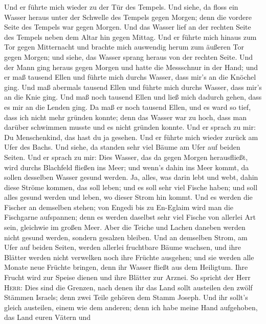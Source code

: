  Und er führte mich wieder zu der Tür des Tempels. Und
siehe, da floss ein Wasser heraus unter der Schwelle des Tempels gegen
Morgen; denn die vordere Seite des Tempels war gegen Morgen. Und das
Wasser lief an der rechten Seite des Tempels neben dem Altar hin gegen
Mittag.  Und er führte mich hinaus zum Tor gegen
Mitternacht und brachte mich auswendig herum zum äußeren Tor gegen
Morgen; und siehe, das Wasser sprang heraus von der rechten Seite.
 Und der Mann ging heraus gegen Morgen und hatte die
Messschnur in der Hand; und er maß tausend Ellen und führte mich durchs
Wasser, dass mir's an die Knöchel ging.  Und maß abermals
tausend Ellen und führte mich durchs Wasser, dass mir's an die Knie
ging. Und maß noch tausend Ellen und ließ mich dadurch gehen, dass es
mir an die Lenden ging.  Da maß er noch tausend Ellen, und
es ward so tief, dass ich nicht mehr gründen konnte; denn das Wasser war
zu hoch, dass man darüber schwimmen musste und es nicht gründen konnte.
 Und er sprach zu mir: Du Menschenkind, das hast du ja
gesehen. Und er führte mich wieder zurück am Ufer des Bachs.
 Und siehe, da standen sehr viel Bäume am Ufer auf beiden
Seiten.  Und er sprach zu mir: Dies Wasser, das da gegen
Morgen herausfließt, wird durchs Blachfeld fließen ins Meer; und wenn's
dahin ins Meer kommt, da sollen desselben Wasser gesund werden.
 Ja, alles, was darin lebt und webt, dahin diese Ströme
kommen, das soll leben; und es soll sehr viel Fische haben; und soll
alles gesund werden und leben, wo dieser Strom hin kommt.
 Und es werden die Fischer an demselben stehen; von
Engedi bis zu En-Eglaim wird man die Fischgarne aufspannen; denn es
werden daselbst sehr viel Fische von allerlei Art sein, gleichwie im
großen Meer.  Aber die Teiche und Lachen daneben werden
nicht gesund werden, sondern gesalzen bleiben.  Und an
demselben Strom, am Ufer auf beiden Seiten, werden allerlei fruchtbare
Bäume wachsen, und ihre Blätter werden nicht verwelken noch ihre Früchte
ausgehen; und sie werden alle Monate neue Früchte bringen, denn ihr
Wasser fließt aus dem Heiligtum. Ihre Frucht wird zur Speise dienen und
ihre Blätter zur Arznei.  So spricht der Herr
\textsc{Herr}: Dies sind die Grenzen, nach denen ihr das Land sollt
austeilen den zwölf Stämmen Israels; denn zwei Teile gehören dem Stamm
Joseph.  Und ihr sollt's gleich austeilen, einem wie dem
anderen; denn ich habe meine Hand aufgehoben, das Land euren Vätern und
